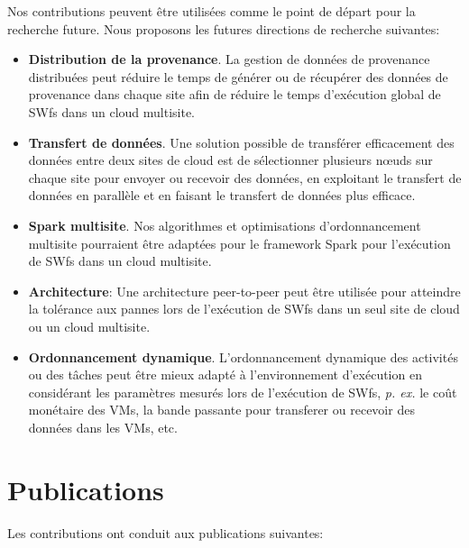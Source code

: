 Nos contributions peuvent être utilisées comme le point de départ pour la recherche future. Nous proposons les futures directions de recherche suivantes:
\begin{itemize}
\item \textbf{Distribution de la provenance}. La gestion de données de provenance distribuées peut réduire le temps de générer ou de récupérer des données de provenance dans chaque site afin de réduire le temps d'exécution global de SWfs dans un cloud multisite.
\item \textbf{Transfert de données}. Une solution possible de transférer efficacement des données entre deux sites de cloud est de sélectionner plusieurs nœuds sur chaque site pour envoyer ou recevoir des données, en exploitant le transfert de données en parallèle et en faisant le transfert de données plus efficace.
\item \textbf{Spark multisite}. Nos algorithmes et optimisations d'ordonnancement multisite pourraient être adaptées pour le framework Spark pour l'exécution de SWfs dans un cloud multisite.
\item \textbf{Architecture}: Une architecture peer-to-peer peut être utilisée pour atteindre la tolérance aux pannes lors de l'exécution de SWfs dans un seul site de cloud ou un cloud multisite.
\item \textbf{Ordonnancement dynamique}. L'ordonnancement dynamique des activités ou des tâches peut être mieux adapté à l'environnement d'exécution en considérant les paramètres mesurés lors de l'exécution de SWfs, \textit{p. ex.} le coût monétaire des VMs, la bande passante pour transferer ou recevoir des données dans les VMs, etc.
\end{itemize}

\section*{Publications}
Les contributions ont conduit aux publications suivantes:

